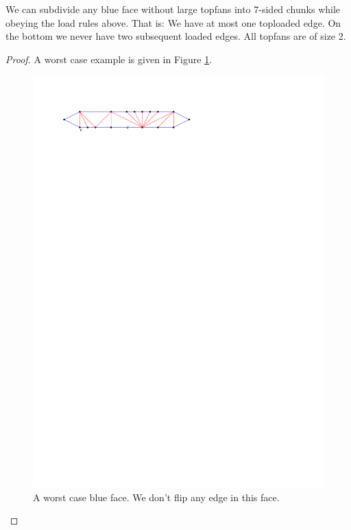 \begin{lemma}
  \label{lm:}
  We can subdivide any blue face without large topfans into 7-sided chunks while obeying the load rules above.
  That is: We have at most one toploaded edge. On the bottom we never have two subsequent loaded edges. All topfans are of size 2.
\end{lemma}

\begin{proof}
  A worst case example is given in Figure \ref{fig:subdiv:worstCase}.

  \begin{figure}[h]
    \centering
    \includegraphics[scale=1]{blueFaceSubdivision/img/worstCase}
    \caption{A worst case blue face. We don't flip any edge in this face.}
    \label{fig:subdiv:worstCase}
  \end{figure}


\end{proof}
